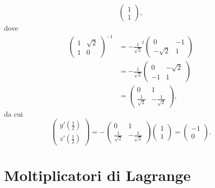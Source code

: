 \begin{ese}
\[\begin{split}
			\begin{pmatrix}
				1 \\
				1
			\end{pmatrix}
			,
		\end{split}
	\]
	dove
	\[
		\begin{split}
			\begin{pmatrix}
				1 & \sqrt{2} \\
				1 & 0
			\end{pmatrix}^{-1}
			& =-\frac{1}{\sqrt{2}}
			^{t}\begin{pmatrix}
				0         & -1 \\
				-\sqrt{2} & 1
			\end{pmatrix}
			\\
			& =-\frac{1}{\sqrt{2}}
			\begin{pmatrix}
				0  & -\sqrt{2} \\
				-1 & 1
			\end{pmatrix}
			\\
			& =
			\begin{pmatrix}
				0                  & 1                   \\
				\frac{1}{\sqrt{2}} & -\frac{1}{\sqrt{2}}
			\end{pmatrix}
			,
		\end{split}
	\]
	da cui
	\[
		\begin{pmatrix}
			y'\left(\frac{1}{2}\right) \\
			z'\left(\frac{1}{2}\right)
		\end{pmatrix}
		=-
		\begin{pmatrix}
			0                  & 1                   \\
			\frac{1}{\sqrt{2}} & -\frac{1}{\sqrt{2}}
		\end{pmatrix}
		\begin{pmatrix}
			1 \\
			1
		\end{pmatrix}
		=
		\begin{pmatrix}
			-1 \\
			0
		\end{pmatrix}
		.
	\]
\end{ese}
%
%
\section{Moltiplicatori di Lagrange}

